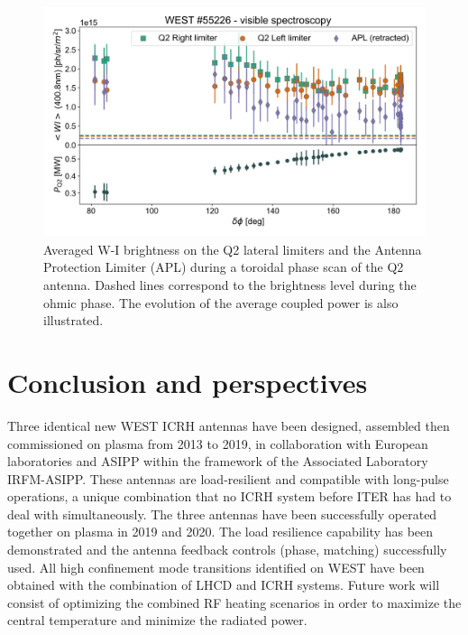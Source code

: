 \documentclass[12p]{iopart}
\begin{document}
\begin{figure}
	\centering
	\includegraphics[width=0.95\linewidth]{figures/WEST_IC_55226}
	\caption{Averaged W-I brightness on the Q2 lateral limiters and the Antenna Protection Limiter (APL) during a toroidal phase scan of the Q2 antenna. Dashed lines correspond to the brightness level during the ohmic phase. The evolution of the average coupled power is also illustrated.}
	\label{fig:westic5522355226}
\end{figure}



\section{Conclusion and perspectives}
Three identical new WEST ICRH antennas have been designed, assembled then commissioned on plasma from 2013 to 2019, in collaboration with European laboratories and ASIPP within the framework of the Associated Laboratory IRFM-ASIPP. These antennas are load-resilient and compatible with long-pulse operations, a unique combination that no ICRH system before ITER has had to deal with simultaneously. The three antennas have been successfully operated together on plasma in 2019 and 2020. The load resilience capability has been demonstrated and the antenna feedback controls (phase, matching) successfully used. All high confinement mode transitions identified on WEST have been obtained with the combination of LHCD and ICRH systems. Future work will consist of optimizing the combined RF heating scenarios in order to maximize the central temperature and minimize the radiated power.
\end{document}
